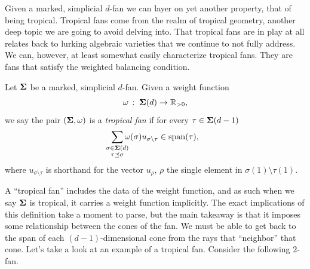 \documentclass[12pt,oneside]{../../sfsuthesis}
\begin{document}
Given a marked, simplicial \( d \)-fan we can layer on yet another property, that of being tropical.
Tropical fans come from the realm of tropical geometry, another deep topic we are going to avoid delving into.
That tropical fans are in play at all relates back to lurking algebraic varieties that we continue to not fully address.
We can, however, at least somewhat easily characterize tropical fans.
They are fans that satisfy the weighted balancing condition.
\begin{definition}\th\label{def:tropical}
    Let \( {\bm{\Sigma}} \) be a marked, simplicial \( d \)-fan.
    Given a weight function
    \[
        \omega\,:\; {\bm{\Sigma}}(d) \to \mathbb{R}_{>0},
    \]
    we say the pair \( ({\bm{\Sigma}}, \omega) \) is a \emph{tropical fan} if for every \( \tau \in {\bm{\Sigma}}(d-1) \)
    \[
        \sum_{\mathclap{\substack{\sigma \in \bSigma(d) \\ \tau \preceq \sigma}}} \omega(\sigma) u_{\sigma \setminus \tau} \in \Span(\tau),
    \]
    where \( u_{\sigma \setminus \tau} \) is shorthand for the vector \( u_{\rho} \), \( \rho \) the single element in \( \sigma(1) \setminus \tau(1) \).
\end{definition}
A ``tropical fan'' includes the data of the weight function, and as such when we say \( {\bm{\Sigma}} \) is tropical, it carries a weight function implicitly.
The exact implications of this definition take a moment to parse, but the main takeaway is that it imposes some relationship between the cones of the fan.
We must be able to get back to the span of each \( (d-1) \)-dimensional cone from the rays that ``neighbor'' that cone.
Let's take a look at an example of a tropical fan.
Consider the following \( 2 \)-fan.
\end{document}
